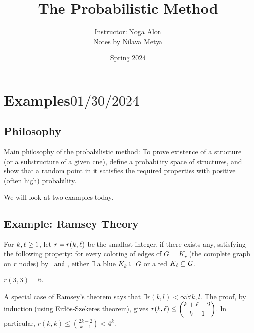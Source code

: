 
\newcommand{\eto}{\stackrel{=}{\to}}
\selectfont 
\usepackage[
backend=biber,
style=alphabetic,%
citestyle=ieee-alphabetic,
maxnames=10,
sorting=ynt
]{biblatex}

\usepackage{adjustbox}
\title{The Probabilistic Method}
\usepackage{quiver}
\author{Instructor: Noga Alon\\Notes by Nilava Metya}
\date{Spring 2024}
\makeatletter
\renewcommand{\@chapapp}{Lecture}
\makeatother



\maketitle
\tableofcontents

\chapter{Examples\hfill\small$01/30/2024\qquad$}

\section{Philosophy}
Main philosophy of the probabilistic method: To prove existence of a structure (or a substructure of a given one), define a probability space of structures, and show that a random point in it satisfies the required properties with positive (often high) probability.

We will look at two examples today.

\section{Example: Ramsey Theory}

\begin{defn}
For $k,\ell\geq 1$, let $r=r(k,\ell)$ be the smallest integer, if there exists any, satisfying the following property: for every coloring of edges of $G=K_r$ (the complete graph on $r$ nodes) by \red~and \blue, either $\exists$ a  blue $K_k\subseteq G$ or a red $K_{\ell}\subseteq G$.
\end{defn}
\begin{ex}
$r(3,3)=6$.
\end{ex}

A special case of Ramsey's theorem says that $\exists r(k,l)<\infty\forall k,l$. The proof, by induction (using Erd\"os-Szekeres theorem), gives $\displaystyle r(k,\ell)\leq\binom{k+\ell-2}{k-1}$. In particular, $r(k,k) \leq \binom{2k-2}{k-1} <4^k$.

